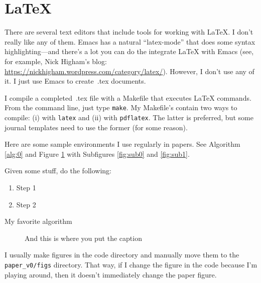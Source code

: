 \section{LaTeX}
\label{sec:latex}

\noindent There are several text editors that include tools for working with LaTeX. I don't really like any of them. Emacs has a natural ``latex-mode'' that does some syntax highlighting---and there's a lot you can do the integrate LaTeX with Emacs (see, for example, Nick Higham's blog: \url{https://nickhigham.wordpress.com/category/latex/}). However, I don't use any of it. I just use Emacs to create~.tex documents. 

I compile a completed~.tex file with a Makefile that executes LaTeX commands. From the command line, just type \texttt{make}. My Makefile's contain two ways to compile: (i) with \texttt{latex} and (ii) with \texttt{pdflatex}. The latter is preferred, but some journal templates need to use the former (for some reason). 

Here are some sample environments I use regularly in papers. See Algorithm \ref{alg:0} and Figure \ref{fig:0} with Subfigures \ref{fig:sub0} and \ref{fig:sub1}. 

\begin{algorithm}
Given some stuff, do the following:
\begin{enumerate}
\itemsep0em
\item Step 1
\item Step 2
\end{enumerate}
\caption{My favorite algorithm}
\label{alg:0}
\end{algorithm}

\begin{figure}[!h]
\centering
{}
\hfil
{}
\caption{And this is where you put the caption}
\label{fig:0}
\end{figure}

I usually make figures in the code directory and manually move them to the \texttt{paper\_v0/figs} directory. That way, if I change the figure in the code because I'm playing around, then it doesn't immediately change the paper figure.
